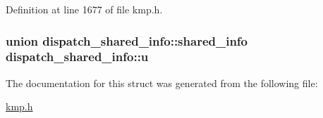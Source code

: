 Definition at line 1677 of file kmp.\-h.

\hypertarget{structdispatch__shared__info_a16b262849d490d72d9bad8b991fa6bb5}{
\subsubsection[{u}]{\setlength{\rightskip}{0pt plus 5cm}union {\bf dispatch\-\_\-shared\-\_\-info\-::shared\-\_\-info}  dispatch\-\_\-shared\-\_\-info\-::u}}\label{structdispatch__shared__info_a16b262849d490d72d9bad8b991fa6bb5}


The documentation for this struct was generated from the following file\-:\begin{DoxyCompactItemize}
\item 
\hyperlink{kmp_8h}{kmp.\-h}\end{DoxyCompactItemize}
